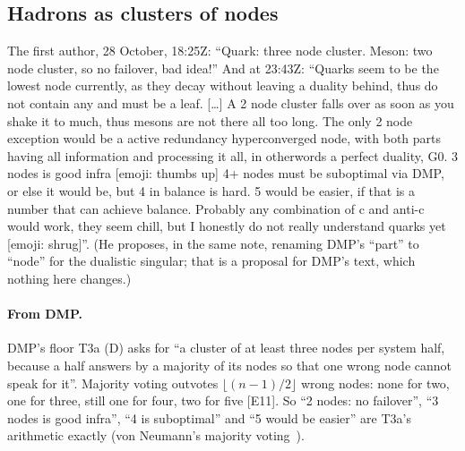 \documentclass[11pt,a4paper]{article}
\theoremstyle{definition}
\theoremstyle{remark}
\newcommand{\chk}[1]{\textsf{[#1]}}
\newcommand{\tagD}{\textsf{(D)}}
\begin{document}
\subsection{Hadrons as clusters of nodes}

The first author, 28 October, 18:25Z: ``Quark: three node cluster. Meson: two node cluster, so no failover, bad idea!'' And at 23:43Z:
``Quarks seem to be the lowest node currently, as they decay without leaving a duality behind, thus do not contain any and must be a leaf.
[\dots] A 2 node cluster falls over as soon as you shake it to much, thus mesons are not there all too long. The only 2 node exception would
be a active redundancy hyperconverged node, with both parts having all information and processing it all, in otherwords a perfect
duality, G0. 3 nodes is good infra [emoji: thumbs up] 4+ nodes must be suboptimal via DMP, or else it would be, but 4 in balance is hard.
5 would be easier, if that is a number that can achieve balance. Probably any combination of c and anti-c would work, they seem chill, but
I honestly do not really understand quarks yet [emoji: shrug]''. (He proposes, in the same note, renaming DMP's ``part'' to ``node'' for
the dualistic singular; that is a proposal for DMP's text, which nothing here changes.)

\paragraph{From DMP.} DMP's floor T3a \tagD{} asks for ``a cluster of at least three nodes per system half, because a half answers by a
majority of its nodes so that one wrong node cannot speak for it''. Majority voting outvotes $\lfloor(n-1)/2\rfloor$ wrong nodes: none
for two, one for three, still one for four, two for five \chk{E11}. So ``2 nodes: no failover'', ``3 nodes is good infra'', ``4 is
suboptimal'' and ``5 would be easier'' are T3a's arithmetic exactly (von Neumann's majority voting~\cite{vonneumann}).
\end{document}
